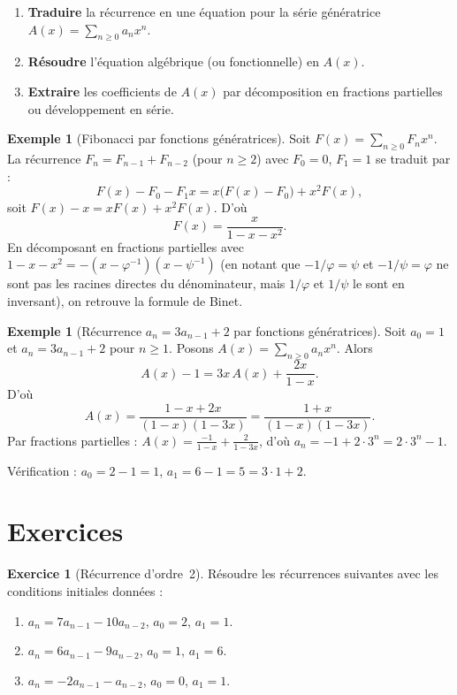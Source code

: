\documentclass[12pt,a4paper,openany]{book}
\theoremstyle{definition}
\newtheorem{exemple}[definition]{Exemple}
\newtheorem{exercice}{Exercice}[chapter]
\theoremstyle{plain}
\theoremstyle{remark}
\begin{document}
\begin{enumerate}[label=\textbf{Étape \arabic*.}]
  \item \textbf{Traduire} la récurrence en une équation pour la série
    génératrice $A(x) = \sum_{n \geq 0} a_n x^n$.
  \item \textbf{Résoudre} l'équation algébrique (ou fonctionnelle) en $A(x)$.
  \item \textbf{Extraire} les coefficients de $A(x)$ par décomposition en
    fractions partielles ou développement en série.
\end{enumerate}

\begin{exemple}[Fibonacci par fonctions génératrices]
\label{ex:fib-gen}
Soit $F(x) = \sum_{n \geq 0} F_n x^n$. La récurrence $F_n = F_{n-1} + F_{n-2}$
(pour $n \geq 2$) avec $F_0 = 0$, $F_1 = 1$ se traduit par :
\[
  F(x) - F_0 - F_1 x = x\bigl(F(x) - F_0\bigr) + x^2 F(x),
\]
soit $F(x) - x = xF(x) + x^2 F(x)$. D'où
\[
  F(x) = \frac{x}{1 - x - x^2}.
\]
En décomposant en fractions partielles avec $1 - x - x^2 = -(x - \varphi^{-1})(x - \psi^{-1})$ (en notant que $-1/\varphi = \psi$ et $-1/\psi = \varphi$ ne sont pas les racines directes du dénominateur, mais $1/\varphi$ et $1/\psi$ le sont en inversant), on retrouve la formule de Binet.
\end{exemple}

\begin{exemple}[Récurrence $a_n = 3a_{n-1} + 2$ par fonctions génératrices]
\label{ex:gen-non-hom}
Soit $a_0 = 1$ et $a_n = 3a_{n-1} + 2$ pour $n \geq 1$.
Posons $A(x) = \sum_{n \geq 0} a_n x^n$. Alors
\[
  A(x) - 1 = 3x\, A(x) + \frac{2x}{1-x}.
\]
D'où
\[
  A(x) = \frac{1 - x + 2x}{(1-x)(1-3x)} = \frac{1+x}{(1-x)(1-3x)}.
\]
Par fractions partielles : $A(x) = \frac{-1}{1-x} + \frac{2}{1-3x}$, d'où
$a_n = -1 + 2 \cdot 3^n = 2 \cdot 3^n - 1$.

Vérification : $a_0 = 2 - 1 = 1$, $a_1 = 6 - 1 = 5 = 3 \cdot 1 + 2$. \checkmark
\end{exemple}

\section{Exercices}
\label{sec:rec-exercices}

\begin{exercice}[Récurrence d'ordre~2]
\label{exo:rec-ordre2}
Résoudre les récurrences suivantes avec les conditions initiales données :
\begin{enumerate}[label=(\alph*)]
  \item $a_n = 7a_{n-1} - 10a_{n-2}$, \quad $a_0 = 2$, $a_1 = 1$.
  \item $a_n = 6a_{n-1} - 9a_{n-2}$, \quad $a_0 = 1$, $a_1 = 6$.
  \item $a_n = -2a_{n-1} - a_{n-2}$, \quad $a_0 = 0$, $a_1 = 1$.
\end{enumerate}
\end{exercice}
\end{document}
